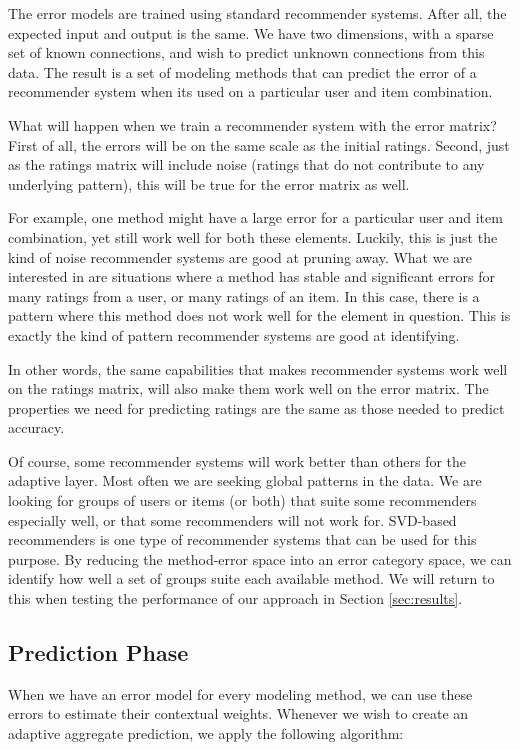 The error models are trained using standard recommender systems.
After all, the expected input and output is the same.
We have two dimensions, with a sparse set of known connections,
and wish to predict unknown connections from this data.
The result is a set of modeling methods
that can predict the error of a recommender system
when its used on a particular user and item combination.

What will happen when we train a recommender system with the error matrix?
First of all, the errors will be on the same scale as the initial ratings.
Second, just as the ratings matrix will include noise (ratings that
do not contribute to any underlying pattern), this will be 
true for the error matrix as well.

For example, one method might have a large error for a particular user and item combination,
yet still work well for both these elements. 
Luckily, this is 
just the kind of noise recommender systems are good at pruning away.
What we are interested in are situations where a method
has stable and significant errors for many ratings from a user,
or many ratings of an item.
In this case, there is a pattern where this method does not 
work well for the element in question.
This is exactly the kind of pattern recommender systems are good at identifying.

In other words, the same capabilities that makes recommender systems work well
on the ratings matrix, will also make them work well on the error matrix.
The properties we need for predicting ratings
are the same as those needed to predict accuracy.

Of course, some recommender systems will work better than others for the adaptive layer.
Most often we are seeking global patterns in the data.
We are looking for groups of users or items (or both) that suite some 
recommenders especially well, or that some recommenders will not work for.
SVD-based recommenders is one type of recommender systems that can be used for this purpose.
By reducing the method-error space into an error category space,
we can identify how well a set of groups suite each available method.
We will return to this when testing the performance
of our approach in Section \ref{sec:results}.


\subsection{Prediction Phase}

When we have an error model for every modeling method, 
we can use these errors to estimate their contextual weights.
Whenever we wish to create an adaptive aggregate prediction,
we apply the following algorithm:

